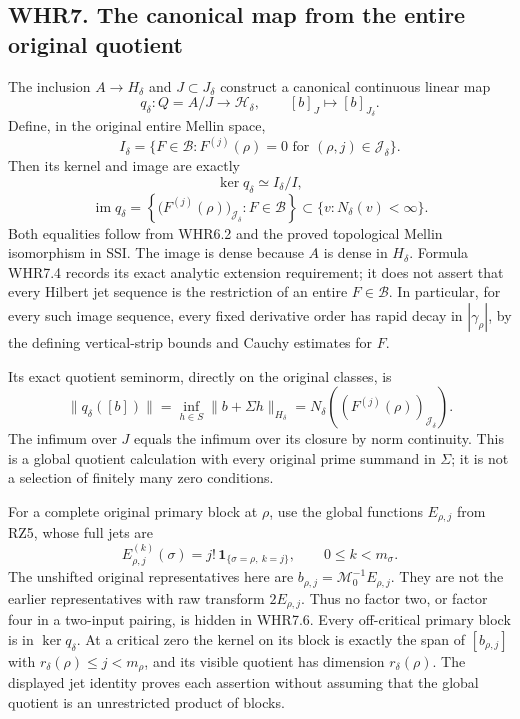 \subsection{WHR7. The canonical map from the entire original
quotient}\label{whr7.-the-canonical-map-from-the-entire-original-quotient}

The inclusion \(A\to H_\delta\) and \(J\subset J_\delta\) construct a
canonical continuous linear map \[
 q_\delta:Q=A/J\longrightarrow\mathcal H_\delta,
 \qquad [b]_J\longmapsto[b]_{J_\delta}.
 \tag{WHR7.1}
\] Define, in the original entire Mellin space, \[
 I_\delta=\{F\in\mathcal B:
 F^{(j)}(\rho)=0\text{ for }(\rho,j)\in\mathscr J_\delta\}.
 \tag{WHR7.2}
\] Then its kernel and image are exactly \[
 \boxed{\ker q_\delta\simeq I_\delta/I,}
 \tag{WHR7.3}
\] \[
 \boxed{\operatorname{im}q_\delta
   =\left\{\bigl(F^{(j)}(\rho)\bigr)_{\mathscr J_\delta}:
                                       F\in\mathcal B\right\}
       \subset\{v:N_\delta(v)<\infty\}.}
 \tag{WHR7.4}
\] Both equalities follow from WHR6.2 and the proved topological Mellin
isomorphism in SSI. The image is dense because \(A\) is dense in
\(H_\delta\). Formula WHR7.4 records its exact analytic extension
requirement; it does not assert that every Hilbert jet sequence is the
restriction of an entire \(F\in\mathcal B\). In particular, for every
such image sequence, every fixed derivative order has rapid decay in
\(|\gamma_\rho|\), by the defining vertical-strip bounds and Cauchy
estimates for \(F\).

Its exact quotient seminorm, directly on the original classes, is \[
 \|q_\delta([b])\|=
 \inf_{h\in S}\|b+\Sigma h\|_{H_\delta}
 =N_\delta\!\left((F^{(j)}(\rho))_{\mathscr J_\delta}\right).
 \tag{WHR7.5}
\] The infimum over \(J\) equals the infimum over its closure by norm
continuity. This is a global quotient calculation with every original
prime summand in \(\Sigma\); it is not a selection of finitely many zero
conditions.

For a complete original primary block at \(\rho\), use the global
functions \(E_{\rho,j}\) from RZ5, whose full jets are \[
 E_{\rho,j}^{(k)}(\sigma)
       =j!\,\mathbf1_{\{\sigma=\rho,\ k=j\}},
 \qquad 0\leq k<m_\sigma.
 \tag{WHR7.6}
\] The unshifted original representatives here are
\(b_{\rho,j}=\mathcal M_0^{-1}E_{\rho,j}\). They are not the earlier
representatives with raw transform \(2E_{\rho,j}\). Thus no factor two,
or factor four in a two-input pairing, is hidden in WHR7.6. Every
off-critical primary block is in \(\ker q_\delta\). At a critical zero
the kernel on its block is exactly the span of \([b_{\rho,j}]\) with
\(r_\delta(\rho)\leq j<m_\rho\), and its visible quotient has dimension
\(r_\delta(\rho)\). The displayed jet identity proves each assertion
without assuming that the global quotient is an unrestricted product of
blocks.


